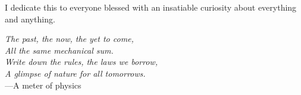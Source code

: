 I dedicate this to everyone blessed with an insatiable curiosity about everything and anything.

\begin{center}
\emph{
    The past, the now, the yet to come,\\
    All the same mechanical sum.\\
    Write down the rules, the laws we borrow,\\
    A glimpse of nature for all tomorrows.\\
}
---A meter of physics\,\\
\end{center}

